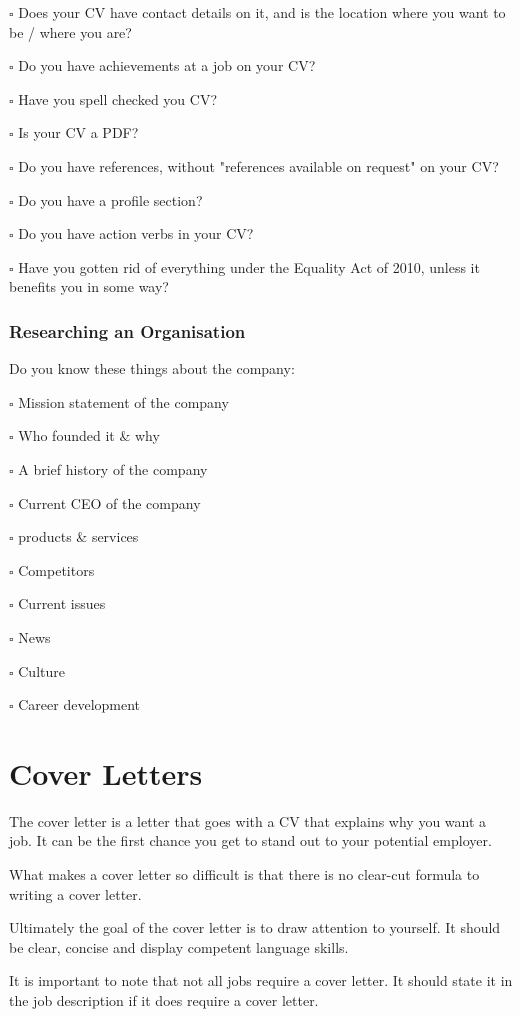 \documentclass{article}
\begin{document}
$\square$ Does your CV have contact details on it, and is the location where you
want to be / where you are?

$\square$ Do you have achievements at a job on your CV?

$\square$ Have you spell checked you CV?

$\square$ Is your CV a PDF?

$\square$ Do you have references, without "references available on request" on
your CV?

$\square$ Do you have a profile section?

$\square$ Do you have action verbs in your CV?

$\square$ Have you gotten rid of everything under the Equality Act of 2010, unless it benefits you in some way?
\subsubsection{Researching an Organisation}
Do you know these things about the company:

$\square$ Mission statement of the company

$\square$ Who founded it \& why

$\square$ A brief history of the company

$\square$ Current CEO of the company

$\square$ products \& services

$\square$ Competitors

$\square$ Current issues

$\square$ News

$\square$ Culture

$\square$ Career development
\newpage
\section{Cover Letters}
The cover letter is a letter that goes with a CV that explains why you
want a job. It can be the first chance you get to stand out to your
potential employer.

What makes a cover letter so difficult is that there is no clear-cut
formula to writing a cover letter.

Ultimately the goal of the cover letter is to draw attention to
yourself. It should be clear, concise and display competent language
skills.

It is important to note that not all jobs require a cover letter. It
should state it in the job description if it does require a cover
letter.
\end{document}
